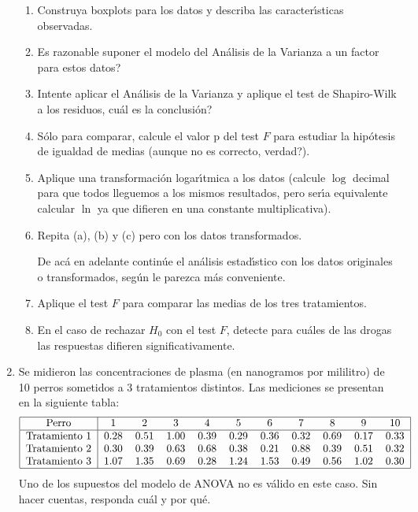 \documentclass[11pt,a4paper,twoside]{article}%
\begin{document}
\begin{enumerate}
\begin{enumerate}
\item Construya boxplots para los datos y describa las caracter\'{\i}sticas observadas.

\item \textquestiondown Es razonable suponer el modelo del An\'{a}lisis de la
Varianza a un factor para estos datos?

\item Intente aplicar el An\'{a}lisis de la Varianza y aplique el test de
Shapiro-Wilk a los residuos, \textquestiondown cu\'{a}l es la conclusi\'{o}n?

\item S\'{o}lo para comparar, calcule el valor p del test $F$ para estudiar la
hip\'{o}tesis de igualdad de medias (aunque no es correcto, \textquestiondown verdad?).

\item Aplique una transformaci\'{o}n logar\'{\i}tmica a los datos (calcule
$\log$ decimal para que todos lleguemos a los mismos resultados, pero
ser\'{\i}a equivalente calcular $\ln$ ya que difieren en una constante multiplicativa).

\item Repita (a), (b) y (c) pero con los datos transformados.

De ac\'{a} en adelante contin\'{u}e el an\'{a}lisis estad\'{\i}stico con los
datos originales o transformados, seg\'{u}n le parezca m\'{a}s conveniente.

\item Aplique el test $F$ para comparar las medias de los tres tratamientos.

\item En el caso de rechazar $H_{0}$ con el test $F$, detecte para cu\'{a}les
de las drogas las respuestas difieren significativamente.
\end{enumerate}

\item Se midieron las concentraciones de plasma (en nanogramos por mililitro)
de 10 perros sometidos a 3 tratamientos distintos. Las mediciones se presentan
en la siguiente tabla:%
\[
\text{%
\begin{tabular}
[c]{|c|cccccccccc|}\hline
Perro & 1 & 2 & 3 & 4 & 5 & 6 & 7 & 8 & 9 & 10\\\hline
Tratamiento 1 & 0.28 & 0.51 & 1.00 & 0.39 & 0.29 & 0.36 & 0.32 & 0.69 & 0.17 &
0.33\\
Tratamiento 2 & 0.30 & 0.39 & 0.63 & 0.68 & 0.38 & 0.21 & 0.88 & 0.39 & 0.51 &
0.32\\
Tratamiento 3 & 1.07 & 1.35 & 0.69 & 0.28 & 1.24 & 1.53 & 0.49 & 0.56 & 1.02 &
0.30\\\hline
\end{tabular}
}%
\]
Uno de los supuestos del modelo de ANOVA no es v\'alido en este caso. Sin hacer cuentas, responda cu\'al
y por qu\'e.


\end{enumerate}
\end{document}
